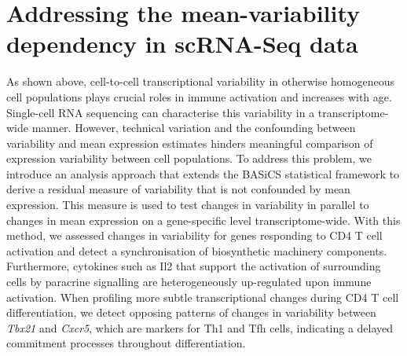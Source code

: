 
\chapter{Addressing the mean-variability dependency in scRNA-Seq data}  

\graphicspath{{Chapter2/Figures/}}

\vfill

\begin{Abstract}
As shown above, cell-to-cell transcriptional variability in otherwise homogeneous cell populations plays crucial roles in immune activation and increases with age. Single-cell RNA sequencing can characterise this variability in a transcriptome-wide manner. However, technical variation and the confounding between variability and mean expression estimates hinders meaningful comparison of expression variability between cell populations. To address this problem, we introduce an analysis approach that extends the BASiCS statistical framework to derive a residual measure of variability that is not confounded by mean expression. This measure is used to test changes in variability in parallel to changes in mean expression on a gene-specific level transcriptome-wide.
With this method, we assessed changes in variability for genes responding to CD4\plus{} T cell activation and detect a synchronisation of biosynthetic machinery components. Furthermore, cytokines such as Il2 that support the activation of surrounding cells by paracrine signalling are heterogeneously up-regulated upon immune activation. When profiling more subtle transcriptional changes during CD4\plus{} T cell differentiation, we detect opposing patterns of changes in variability between \textit{Tbx21} and \textit{Cxcr5}, which are markers for Th1 and Tfh cells, indicating a delayed commitment processes throughout differentiation. 
\end{Abstract}

\vfill

\newpage

\vspace*{\fill}

